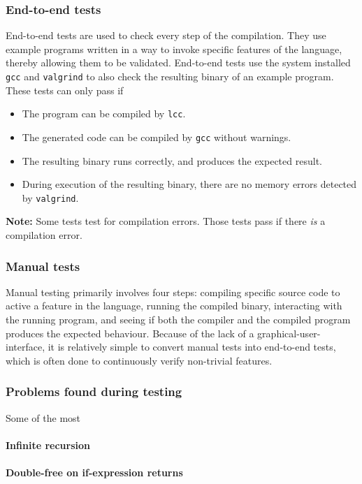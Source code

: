 \documentclass[12pt]{article}
\begin{document}
\subsubsection{End-to-end tests}

End-to-end tests are used to check every step of the compilation. They use
example programs written in a way to invoke specific features of the language,
thereby allowing them to be validated. End-to-end tests use the system installed
\verb$gcc$ and \verb$valgrind$ to also check the resulting binary of an example
program. These tests can only pass if
\begin{itemize}
    \item The program can be compiled by \verb$lcc$.
    \item The generated code can be compiled by \verb$gcc$ without warnings.
    \item The resulting binary runs correctly, and produces the expected result.
    \item During execution of the resulting binary, there are no memory errors
        detected by \verb$valgrind$.
\end{itemize}
\textbf{Note:} Some tests test for compilation errors. Those tests pass if there
\emph{is} a compilation error.

\subsubsection{Manual tests}

Manual testing primarily involves four steps: compiling specific source code to
active a feature in the language, running the compiled binary, interacting with
the running program, and seeing if both the compiler and the compiled program
produces the expected behaviour. Because of the lack of a
graphical-user-interface, it is relatively simple to convert manual tests into
end-to-end tests, which is often done to continuously verify non-trivial
features.

\subsubsection{Problems found during testing} %

Some of the most 

\paragraph{Infinite recursion}
\paragraph{Double-free on if-expression returns}
\end{document}
